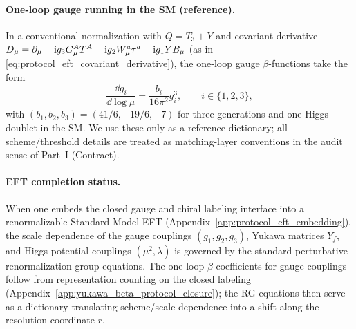 \paragraph{One-loop gauge running in the SM (reference).}
In a conventional normalization with $Q=T_3+Y$ and covariant derivative $D_\mu=\partial_\mu-\mathrm{i} g_3 G_\mu^A T^A-\mathrm{i} g_2 W_\mu^a\tau^a-\mathrm{i} g_1 Y B_\mu$ (as in \eqref{eq:protocol_eft_covariant_derivative}), the one-loop gauge $\beta$-functions take the form
\begin{equation}
\frac{\dd g_i}{\dd\log\mu}=\frac{b_i}{16\pi^2}g_i^3,\qquad i\in\{1,2,3\},
\end{equation}
with $(b_1,b_2,b_3)=(41/6,-19/6,-7)$ for three generations and one Higgs doublet in the SM.
We use these only as a reference dictionary; all scheme/threshold details are treated as matching-layer conventions in the audit sense of Part~I (Contract).

\paragraph{EFT completion status.}
\InterfaceTag When one embeds the closed gauge and chiral labeling interface into a renormalizable Standard Model EFT (Appendix~\ref{app:protocol_eft_embedding}), the scale dependence of the gauge couplings $(g_1,g_2,g_3)$, Yukawa matrices $Y_f$, and Higgs potential couplings $(\mu^2,\lambda)$ is governed by the standard perturbative renormalization-group equations.
The one-loop $\beta$-coefficients for gauge couplings follow from representation counting on the closed labeling (Appendix~\ref{app:yukawa_beta_protocol_closure}); the RG equations then serve as a dictionary translating scheme/scale dependence into a shift along the resolution coordinate $r$.

